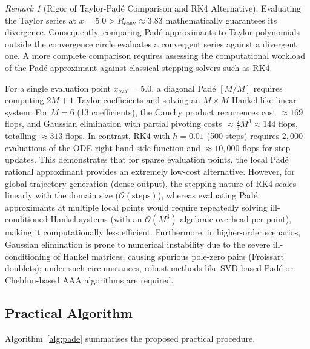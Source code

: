 \documentclass[12pt,a4paper]{article}
\theoremstyle{definition}
\theoremstyle{remark}
\newtheorem{remark}[theorem]{Remark}
\newcommand{\Rconv}{R_{\mathrm{conv}}}
\newcommand{\OO}{\mathcal{O}}
\begin{document}
\begin{remark}[Rigor of Taylor-Padé Comparison and RK4 Alternative]
  \label{rem:pade_rk4_work}
  Evaluating the Taylor series at $x = 5.0 > \Rconv \approx 3.83$
  mathematically guarantees its divergence. Consequently, comparing Padé
  approximants to Taylor polynomials outside the convergence circle evaluates
  a convergent series against a divergent one. A more complete comparison
  requires assessing the computational workload of the Padé approximant
  against classical stepping solvers such as RK4.

  For a single evaluation point $x_{\mathrm{eval}} = 5.0$, a diagonal Padé
  $[M/M]$ requires computing $2M+1$ Taylor coefficients and solving an
  $M \times M$ Hankel-like linear system. For $M=6$ (13 coefficients), the Cauchy product
  recurrences cost $\approx 169$ flops, and Gaussian elimination with partial pivoting
  costs $\approx \frac{2}{3} M^3 \approx 144$ flops, totalling $\approx 313$ flops. In contrast,
  RK4 with $h = 0.01$ (500 steps) requires $2{,}000$ evaluations of the ODE right-hand-side
  function and $\approx 10{,}000$ flops for step updates. This demonstrates that for sparse
  evaluation points, the local Padé rational approximant provides an extremely low-cost alternative.
  However, for global trajectory generation (dense output), the stepping nature of RK4 scales linearly
  with the domain size ($\OO(\text{steps})$), whereas evaluating Padé approximants at multiple local points
  would require repeatedly solving ill-conditioned Hankel systems (with an $\OO(M^3)$ algebraic overhead per point),
  making it computationally less efficient. Furthermore, in higher-order scenarios, Gaussian elimination is prone
  to numerical instability due to the severe ill-conditioning of Hankel matrices, causing spurious pole-zero pairs
  (Froissart doublets); under such circumstances, robust methods like SVD-based Padé or Chebfun-based AAA algorithms
  are required.
\end{remark}

\subsection{Practical Algorithm}

Algorithm~\ref{alg:pade} summarises the proposed practical procedure.
\end{document}
